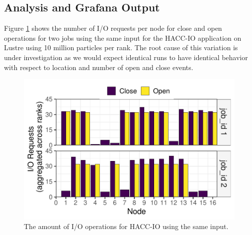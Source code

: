 \subsection{Analysis and Grafana Output}
Figure \ref{f:hacc2} shows the number of I/O requests per node for close and 
open operations for two jobs using the same input for the HACC-IO application 
on Lustre using 10 million particles per rank. The root cause of this variation 
is under investigation as we would expect identical runs to have identical
behavior with respect to location and number of open and close events.


\begin{figure}
	\centering
        \includegraphics[width=\linewidth]{figs/hacc_nfs_10.pdf}
	\caption{The amount of I/O operations for HACC-IO using the same input.}
	\label{f:hacc2}
\end{figure}

